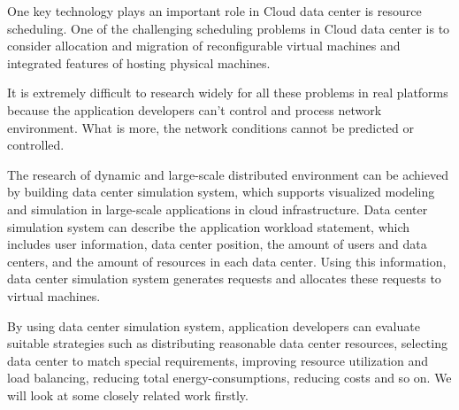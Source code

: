 \documentclass[3p, twocolumn]{elsarticle}
\begin{document}
One key technology plays an important role in Cloud data center is resource scheduling. One of the challenging scheduling problems in Cloud data center is to consider allocation and migration of reconfigurable virtual machines and integrated features of hosting physical machines.

It is extremely difficult to research widely for all these problems in real platforms because the application developers can't control and process network environment. What is more, the network conditions cannot be predicted or controlled.

The research of dynamic and large-scale distributed environment can be achieved by building data center simulation system, which supports visualized modeling and simulation in large-scale applications in cloud infrastructure. Data center simulation system can describe the application workload statement, which includes user information, data center position, the amount of users and data centers, and the amount of resources in each data center. Using this information, data center simulation system generates requests and allocates these requests to virtual machines.

By using data center simulation system, application developers can evaluate suitable strategies such as distributing reasonable data center resources, selecting data center to match special requirements, improving resource utilization and load balancing, reducing total energy-consumptions, reducing costs and so on. We will look at some closely related work firstly.
\end{document}

